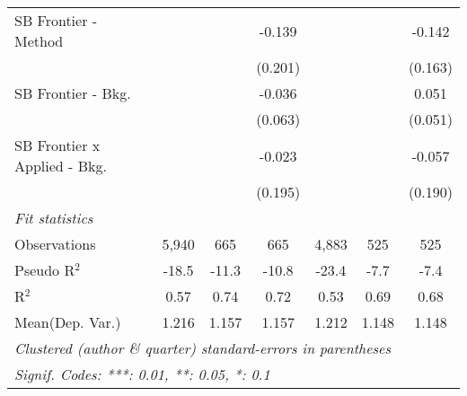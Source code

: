 \begin{tabular}{lcccccc}
   SB Frontier - Method           &         &         & -0.139  &         &         & -0.142\\   
                                  &         &         & (0.201) &         &         & (0.163)\\   
   SB Frontier - Bkg.             &         &         & -0.036  &         &         & 0.051\\   
                                  &         &         & (0.063) &         &         & (0.051)\\   
   SB Frontier x Applied - Bkg.   &         &         & -0.023  &         &         & -0.057\\   
                                  &         &         & (0.195) &         &         & (0.190)\\   
   \midrule
   \emph{Fit statistics}\\
   Observations                   & 5,940   & 665     & 665     & 4,883   & 525     & 525\\  
   Pseudo R$^2$                   & -18.5   & -11.3   & -10.8   & -23.4   & -7.7    & -7.4\\  
   R$^2$                          & 0.57    & 0.74    & 0.72    & 0.53    & 0.69    & 0.68\\  
Mean(Dep. Var.) & 1.216 & 1.157 & 1.157 & 1.212 & 1.148 & 1.148 \\
   \midrule \midrule
   \multicolumn{7}{l}{\emph{Clustered (author \& quarter) standard-errors in parentheses}}\\
   \multicolumn{7}{l}{\emph{Signif. Codes: ***: 0.01, **: 0.05, *: 0.1}}\\
\end{tabular}
\par\endgroup
